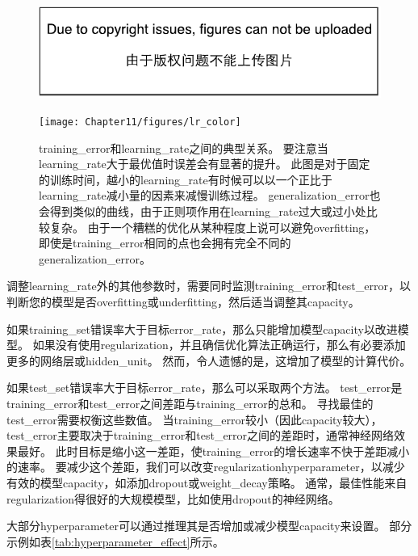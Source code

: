 \begin{figure}[!htb]
\ifOpenSource
\centerline{\includegraphics{figure.pdf}}
\else
\centerline{\texttt{[image: Chapter11/figures/lr\_color]}}
\fi
\caption{\gls{training_error}和\gls{learning_rate}之间的典型关系。
要注意当\gls{learning_rate}大于最优值时误差会有显著的提升。
此图是对于固定的训练时间，越小的\gls{learning_rate}有时候可以以一个正比于\gls{learning_rate}减小量的因素来减慢训练过程。
\gls{generalization_error}也会得到类似的曲线，由于正则项作用在\gls{learning_rate}过大或过小处比较复杂。
由于一个糟糕的优化从某种程度上说可以避免\gls{overfitting}，即使是\gls{training_error}相同的点也会拥有完全不同的\gls{generalization_error}。}
\label{fig:chap11_lr}
\end{figure}

调整\gls{learning_rate}外的其他参数时，需要同时监测\gls{training_error}和\gls{test_error}，以判断您的模型是否\gls{overfitting}或\gls{underfitting}，然后适当调整其\gls{capacity}。


如果\gls{training_set}错误率大于目标\gls{error_rate}，那么只能增加模型\gls{capacity}以改进模型。
如果没有使用\gls{regularization}，并且确信优化算法正确运行，那么有必要添加更多的网络层或\gls{hidden_unit}。
然而，令人遗憾的是，这增加了模型的计算代价。


如果\gls{test_set}错误率大于目标\gls{error_rate}，那么可以采取两个方法。
\gls{test_error}是\gls{training_error}和\gls{test_error}之间差距与\gls{training_error}的总和。
寻找最佳的\gls{test_error}需要权衡这些数值。
当\gls{training_error}较小（因此\gls{capacity}较大），\gls{test_error}主要取决于\gls{training_error}和\gls{test_error}之间的差距时，通常神经网络效果最好。
此时目标是缩小这一差距，使\gls{training_error}的增长速率不快于差距减小的速率。
要减少这个差距，我们可以改变\gls{regularization}\gls{hyperparameter}，以减少有效的模型\gls{capacity}，如添加\gls{dropout}或\gls{weight_decay}策略。
通常，最佳性能来自\gls{regularization}得很好的大规模模型，比如使用\gls{dropout}的神经网络。


大部分\gls{hyperparameter}可以通过推理其是否增加或减少模型\gls{capacity}来设置。
部分示例如表\ref{tab:hyperparameter_effect}所示。


